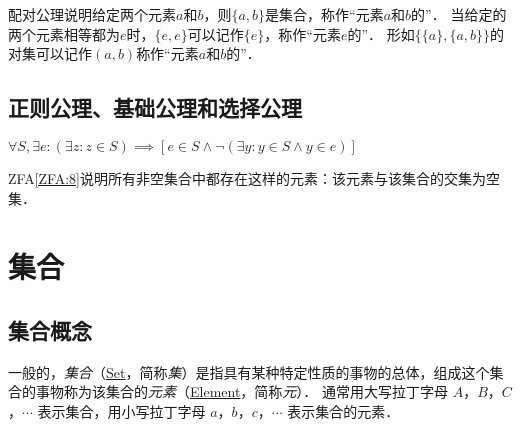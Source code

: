 配对公理说明给定两个元素$a$和$b$，则$ \{ a, b \} $是集合，称作``元素$a$和$b$的''．
当给定的两个元素相等都为$e$时，$ \{ e, e \} $可以记作$ \{ e \} $，称作``元素$e$的''．
形如$ \{ \{ a \}, \{ a, b \} \} $的对集可以记作$ (a, b) $称作``元素$a$和$b$的''．

\begin{ZermeloFraenkelAxioms}[并集公理]\label{ZFA:4}
\end{ZermeloFraenkelAxioms}

\begin{ZermeloFraenkelAxioms}[幂集公理]\label{ZFA:5}
\end{ZermeloFraenkelAxioms}

\begin{ZermeloFraenkelAxioms}[无穷公理]\label{ZFA:6}
\end{ZermeloFraenkelAxioms}

\begin{ZermeloFraenkelAxioms}[替换公理]\label{ZFA:7}
\end{ZermeloFraenkelAxioms}

\subsection{正则公理、基础公理和选择公理}

\begin{ZermeloFraenkelAxioms}[正则公理]\label{ZFA:8}
    $ \forall S, \exists e: (\exists z: z \in S) \implies [e \in S \land \lnot(\exists y: y \in S \land y \in e)] $
\end{ZermeloFraenkelAxioms}
ZFA\ref{ZFA:8}说明所有非空集合中都存在这样的元素：该元素与该集合的交集为空集．


\section{集合}

\subsection{集合概念}

一般的，\emph{集合}（\href{http://mathworld.wolfram.com/Set.html}{Set}，简称\emph{集}）是指具有某种特定性质的事物的总体，组成这个集合的事物称为该集合的\emph{元素}（\href{http://mathworld.wolfram.com/Element.html}{Element}，简称\emph{元}）．
通常用大写拉丁字母 $A$，$B$，$C$，$\cdots$ 表示集合，用小写拉丁字母 $a$，$b$，$c$，$\cdots$ 表示集合的元素．

